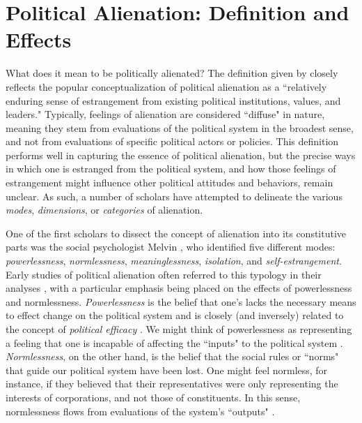 \documentclass[12pt]{article}
\begin{document}
\section{Political Alienation: Definition and Effects}
What does it mean to be politically alienated? The definition given by \textcite[][3]{citrin1975} closely reflects the popular conceptualization of political alienation as a ``relatively enduring sense of estrangement from existing political institutions, values, and leaders." Typically, feelings of alienation are considered ``diffuse" \parencite{easton1965systems} in nature, meaning they stem from evaluations of the political system in the broadest sense, and not from evaluations of specific political actors or policies. This definition performs well in capturing the essence of political alienation, but the precise ways in which one is estranged from the political system, and how those feelings of estrangement might influence other political attitudes and behaviors, remain unclear. As such, a number of scholars have attempted to delineate the various \textit{modes}, \textit{dimensions}, or \textit{categories} of alienation. 

One of the first scholars to dissect the concept of alienation into its constitutive parts was the social psychologist Melvin \textcite{seeman1959}, who identified five different modes: \textit{powerlessness}, \textit{normlessness}, \textit{meaninglessness}, \textit{isolation}, and \textit{self-estrangement}. Early studies of political alienation often referred to this typology in their analyses \parencite{horton1962powerlessness,aberbach1969alienation,olsen1969}, with a particular emphasis being placed on the effects of powerlessness and normlessness. \textit{Powerlessness} is the belief that one's lacks the necessary means to effect change on the political system \parencite{seeman1959,olsen1969,finifter1970dimensions} and is closely (and inversely) related to the concept of \textit{political efficacy} \parencite{campbell1960american,gamson1961}. We might think of powerlessness as representing a feeling that one is incapable of affecting the ``inputs" to the political system \parencite{easton1965systems,almond1963civic}. \textit{Normlessness}, on the other hand, is the belief that the social rules or ``norms" that guide our political system have been lost. One might feel normless, for instance, if they believed that their representatives were only representing the interests of corporations, and not those of constituents. In this sense, normlessness flows from evaluations of the system's ``outputs" \parencite{easton1965systems,almond1963civic}. 
\end{document}
